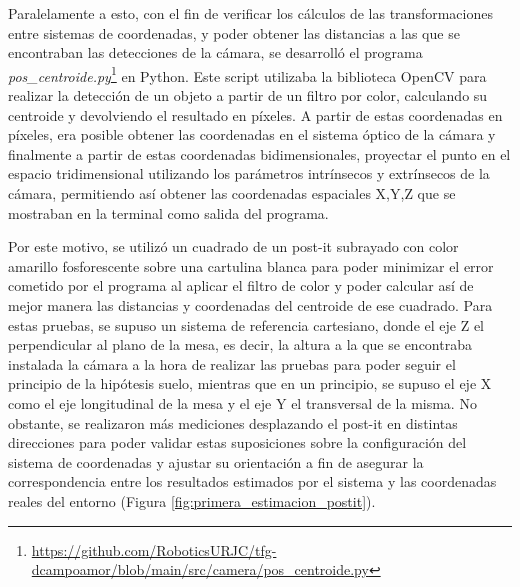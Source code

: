 Paralelamente a esto, con el fin de verificar los cálculos de las transformaciones entre sistemas de coordenadas, y poder obtener las distancias a las que se encontraban las detecciones de la cámara, se desarrolló el programa \textit{pos\_centroide.py}\footnote{\url{https://github.com/RoboticsURJC/tfg-dcampoamor/blob/main/src/camera/pos_centroide.py}} en Python. Este script utilizaba la biblioteca OpenCV para realizar la detección de un objeto a partir de un filtro por color, calculando su centroide y devolviendo el resultado en píxeles. A partir de estas coordenadas en píxeles, era posible obtener las coordenadas en el sistema óptico de la cámara y finalmente a partir de estas coordenadas bidimensionales, proyectar el punto en el espacio tridimensional utilizando los parámetros intrínsecos y extrínsecos de la cámara, permitiendo así obtener las coordenadas espaciales X,Y,Z que se mostraban en la terminal como salida del programa. 

Por este motivo, se utilizó un cuadrado de un post-it subrayado con color amarillo fosforescente sobre una cartulina blanca para poder minimizar el error cometido por el programa al aplicar el filtro de color y poder calcular así de mejor manera las distancias y coordenadas del centroide de ese cuadrado. Para estas pruebas, se supuso un sistema de referencia cartesiano, donde el eje Z el perpendicular al plano de la mesa, es decir, la altura a la que se encontraba instalada la cámara a la hora de realizar las pruebas para poder seguir el principio de la hipótesis suelo, mientras que en un principio, se supuso el eje X como el eje longitudinal de la mesa y el eje Y el transversal de la misma. No obstante, se realizaron más mediciones desplazando el post-it en distintas direcciones para poder validar estas suposiciones sobre la configuración del sistema de coordenadas y ajustar su orientación a fin de asegurar la correspondencia entre los resultados estimados por el sistema y las coordenadas reales del entorno (Figura \ref{fig:primera_estimacion_postit}).

